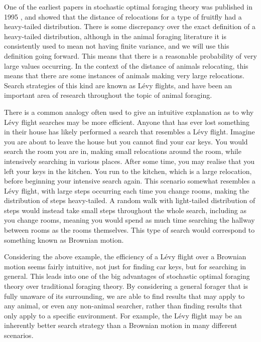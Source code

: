 One of the earliest papers in stochastic optimal foraging theory was published in 1995 \cite{Cole_1995}, and showed that the distance of relocations for a type of fruitfly had a heavy-tailed distribution. 
There is some discrepancy over the exact definition of a heavy-tailed distribution, although in the animal foraging literature it is consistently used to mean not having finite variance, and we will use this definition going forward. This means that there is a reasonable probability of very large values occurring. In the context of the distance of animals relocating, this means that there are some instances of animals making very large relocations. Search strategies of this kind are known as L\'{e}vy flights, and have been an important area of research throughout the topic of animal foraging.

There is a common analogy often used \cite{Viswanathan_2009} to give an intuitive explanation as to why L\'{e}vy flight searches may be more efficient. Anyone that has ever lost something in their house has likely performed a search that resembles a L\'{e}vy flight. Imagine you are about to leave the house but you cannot find your car keys. You would search the room you are in, making small relocations around the room, while intensively searching in various places. After some time, you may realise that you left your keys in the kitchen. You run to the kitchen, which is a large relocation, before beginning your intensive search again. This scenario somewhat resembles a L\'{e}vy flight, with large steps occurring each time you change rooms, making the distribution of steps heavy-tailed. A random walk with light-tailed distribution of steps would instead take small steps throughout the whole search, including as you change rooms, meaning you would spend as much time searching the hallway between rooms as the rooms themselves. This type of search would correspond to something known as Brownian motion. 

Considering the above example, the efficiency of a L\'{e}vy flight over a Brownian motion seems fairly intuitive, not just for finding car keys, but for searching in general. This leads into one of the big advantages of stochastic optimal foraging theory over traditional foraging theory. By considering a general forager that is fully unaware of its surrounding, we are able to find results that may apply to any animal, or even any non-animal searcher, rather than finding results that only apply to a specific environment. For example, the L\'{e}vy flight may be an inherently better search strategy than a Brownian motion in many different scenarios.

